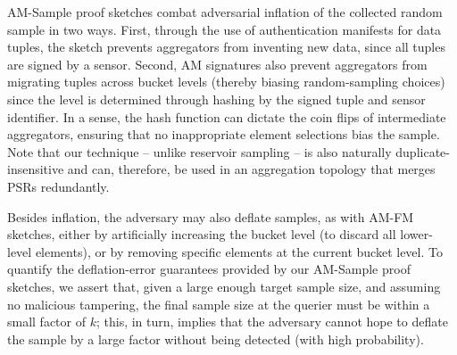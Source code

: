 \documentclass[10pt,twocolumn]{article}
\newcommand{\amfm}{AM-FM\xspace}
\newcommand{\amsampl}{AM-Sample\xspace}
\newcommand{\proofsketches}{proof sketches\xspace}
\begin{document}
\begin{figure}
\label{fig:distinctSample}
\vspace*{-2em}
\end{figure}



\label{sec:sampleanalysis}
\vspace{-1em}
\amsampl \proofsketches combat adversarial inflation of the collected
random sample in two ways.
First, through the use of authentication manifests for data tuples, the 
sketch prevents aggregators from inventing new data, since all tuples
are signed by a sensor.
Second, AM signatures also prevent aggregators from migrating tuples across bucket 
levels (thereby biasing random-sampling choices) since the level is
determined through hashing by the signed tuple and sensor identifier.
In a sense, the hash function can 
dictate the coin flips of intermediate aggregators, ensuring that no
inappropriate element selections bias the sample.
Note that our technique -- unlike reservoir
sampling -- is also naturally
duplicate-insensitive and can, therefore, be used in an aggregation
topology that merges PSRs redundantly.

Besides inflation, the adversary may also deflate samples,  as with \amfm
sketches, either by artificially increasing the bucket 
level (to discard all lower-level elements), or by removing specific elements 
at the current bucket level.
To quantify the deflation-error guarantees provided by our 
\amsampl \proofsketches, we assert that, given a large enough target sample size, and
assuming no malicious tampering, the final sample size at the querier
must be within a small factor of $k$;
this, in turn, implies that the adversary cannot hope to deflate the sample by
a large factor without being detected (with high probability).
\end{document}
